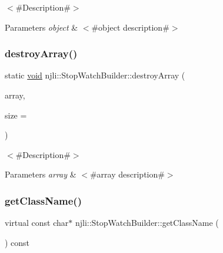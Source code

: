 $<$\#\+Description\#$>$


\begin{DoxyParams}{Parameters}
{\em object} & $<$\#object description\#$>$ \\
\hline
\end{DoxyParams}
\mbox{\label{classnjli_1_1_stop_watch_builder_a0c128e2e33b479212c00e15620755e0f}} 
\subsubsection{\texorpdfstring{destroy\+Array()}{destroyArray()}}
{\footnotesize\ttfamily static \mbox{\hyperlink{_thread_8h_af1e856da2e658414cb2456cb6f7ebc66}{void}} njli\+::\+Stop\+Watch\+Builder\+::destroy\+Array (\begin{DoxyParamCaption}\item[{\mbox{\hyperlink{classnjli_1_1_stop_watch_builder}{Stop\+Watch\+Builder}} $\ast$$\ast$}]{array,  }\item[{const \mbox{\hyperlink{_util_8h_a10e94b422ef0c20dcdec20d31a1f5049}{u32}}}]{size = {} }\end{DoxyParamCaption})\hspace{0.3cm}{\ttfamily [static]}}

$<$\#\+Description\#$>$


\begin{DoxyParams}{Parameters}
{\em array} & $<$\#array description\#$>$ \\
\hline
\end{DoxyParams}
\mbox{\label{classnjli_1_1_stop_watch_builder_a186409ee0a19e75489cdab4bcf580d3a}} 
\subsubsection{\texorpdfstring{get\+Class\+Name()}{getClassName()}}
{\footnotesize\ttfamily virtual const char$\ast$ njli\+::\+Stop\+Watch\+Builder\+::get\+Class\+Name (\begin{DoxyParamCaption}{ }\end{DoxyParamCaption}) const\hspace{0.3cm}{\ttfamily [virtual]}}

